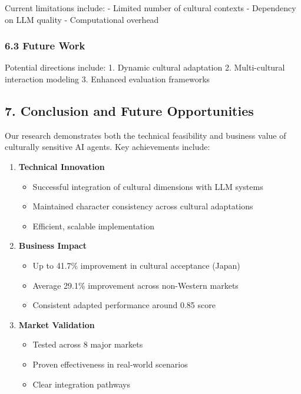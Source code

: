 \documentclass[
]{article}
\providecommand{\tightlist}{%
  \setlength{\itemsep}{0pt}\setlength{\parskip}{0pt}}
\begin{document}
Current limitations include: - Limited number of cultural contexts -
Dependency on LLM quality - Computational overhead

\subsubsection{6.3 Future Work}\label{future-work}

Potential directions include: 1. Dynamic cultural adaptation 2.
Multi-cultural interaction modeling 3. Enhanced evaluation frameworks

\subsection{7. Conclusion and Future
Opportunities}\label{conclusion-and-future-opportunities}

Our research demonstrates both the technical feasibility and business
value of culturally sensitive AI agents. Key achievements include:

\begin{enumerate}
\def\labelenumi{\arabic{enumi}.}
\tightlist
\item
  \textbf{Technical Innovation}

  \begin{itemize}
  \tightlist
  \item
    Successful integration of cultural dimensions with LLM systems
  \item
    Maintained character consistency across cultural adaptations
  \item
    Efficient, scalable implementation
  \end{itemize}
\item
  \textbf{Business Impact}

  \begin{itemize}
  \tightlist
  \item
    Up to 41.7\% improvement in cultural acceptance (Japan)
  \item
    Average 29.1\% improvement across non-Western markets
  \item
    Consistent adapted performance around 0.85 score
  \end{itemize}
\item
  \textbf{Market Validation}

  \begin{itemize}
  \tightlist
  \item
    Tested across 8 major markets
  \item
    Proven effectiveness in real-world scenarios
  \item
    Clear integration pathways
  \end{itemize}
\end{enumerate}
\end{document}

